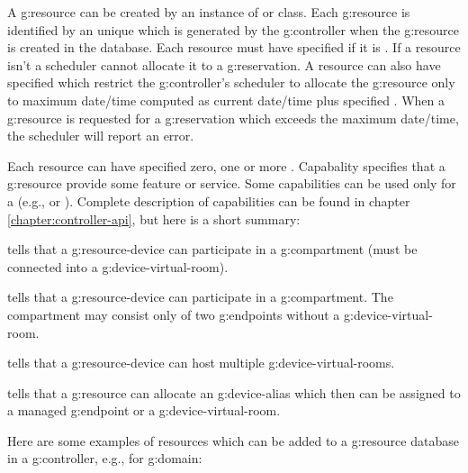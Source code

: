 A \gls{g:resource} can be created by an instance of  or  class. Each \gls{g:resource} is identified by an unique  which is generated by the \gls{g:controller} when the \gls{g:resource} is created in the database. Each resource must have specified if it is . If a resource isn't  a scheduler cannot allocate it to a \gls{g:reservation}. A resource can also have specified  which restrict the \gls{g:controller}'s scheduler to allocate the \gls{g:resource} only to maximum date/time computed as current date/time plus specified . When a \gls{g:resource} is requested for a \gls{g:reservation} which exceeds the maximum date/time, the scheduler will report an error.

Each resource can have specified zero, one or more . Capabality specifies that a \gls{g:resource} provide some feature or service. Some capabilities can be used only for a  (e.g.,  or ). Complete description of capabilities can be found in chapter \ref{chapter:controller-api}, but here is a short summary:
\begin{compactitem}
\item {} tells that a \gls{g:resource-device} can participate in a \gls{g:compartment} (must be connected into a \gls{g:device-virtual-room}).
\item {} tells that a \gls{g:resource-device} can participate in a \gls{g:compartment}. The compartment may consist only of two \glspl{g:endpoint} without a \gls{g:device-virtual-room}.
\item {} tells that a \gls{g:resource-device} can host multiple \glspl{g:device-virtual-room}.
\item {} tells that a \gls{g:resource} can allocate an \gls{g:device-alias} which then can be assigned to a managed \gls{g:endpoint} or a \gls{g:device-virtual-room}.
\end{compactitem}

Here are some examples of resources which can be added to a \gls{g:resource} database in a \gls{g:controller}, e.g., for  \gls{g:domain}:

